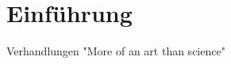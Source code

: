 
\section{Einführung}

\begin{frame}{Verhandlungen}
  "More of an art than science" \cite[][p.12]{mccarthy_advanced_2015}


\end{frame}
